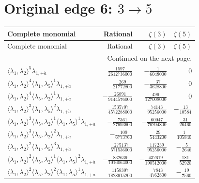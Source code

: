 \section{Original edge 6: $3\to 5$}
\begin{longtable}{@{}lrrr@{}}
\toprule
Complete monomial & Rational & $\zeta(3)$ & $\zeta(5)$ \\
\midrule\endfirsthead
\toprule Complete monomial & Rational & $\zeta(3)$ & $\zeta(5)$ \\
\midrule\endhead
\midrule\multicolumn{4}{r}{Continued on the next page.}\\\endfoot
\bottomrule\endlastfoot
$\langle\lambda_1,\lambda_2\rangle^{5}\lambda_{1,+\dot a}$ & $\frac{1597}{2612736000}$ & $-\frac{1}{6048000}$ & $0$ \\
$\langle\lambda_1,\lambda_2\rangle^{4}\langle\lambda_1,\lambda_5\rangle^{1}\lambda_{1,+\dot a}$ & $\frac{269}{21772800}$ & $-\frac{37}{3628800}$ & $0$ \\
$\langle\lambda_1,\lambda_2\rangle^{4}\langle\lambda_5,\lambda_2\rangle^{1}\lambda_{1,+\dot a}$ & $-\frac{26891}{9144576000}$ & $\frac{499}{127008000}$ & $0$ \\
$\langle\lambda_1,\lambda_2\rangle^{3}\langle\lambda_1,\lambda_5\rangle^{2}\lambda_{1,+\dot a}$ & $\frac{1535707}{4572288000}$ & $\frac{74143}{95256000}$ & $-\frac{13}{10584}$ \\
$\langle\lambda_1,\lambda_2\rangle^{3}\langle\lambda_5,\lambda_2\rangle^{1}\langle\lambda_1,\lambda_5\rangle^{1}\lambda_{1,+\dot a}$ & $-\frac{7361}{27993600}$ & $-\frac{60047}{76204800}$ & $\frac{31}{26460}$ \\
$\langle\lambda_1,\lambda_2\rangle^{3}\langle\lambda_5,\lambda_2\rangle^{2}\lambda_{1,+\dot a}$ & $-\frac{109}{6773760}$ & $\frac{29}{5443200}$ & $\frac{1}{105840}$ \\
$\langle\lambda_1,\lambda_2\rangle^{2}\langle\lambda_1,\lambda_5\rangle^{3}\lambda_{1,+\dot a}$ & $\frac{275137}{571536000}$ & $\frac{117239}{95256000}$ & $-\frac{5}{2646}$ \\
$\langle\lambda_1,\lambda_2\rangle^{2}\langle\lambda_5,\lambda_2\rangle^{1}\langle\lambda_1,\lambda_5\rangle^{2}\lambda_{1,+\dot a}$ & $-\frac{832639}{1016064000}$ & $-\frac{432619}{190512000}$ & $\frac{181}{52920}$ \\
$\langle\lambda_1,\lambda_2\rangle^{2}\langle\lambda_5,\lambda_2\rangle^{2}\langle\lambda_1,\lambda_5\rangle^{1}\lambda_{1,+\dot a}$ & $\frac{1158307}{1828915200}$ & $\frac{7843}{4762800}$ & $-\frac{19}{7560}$ \\

\end{longtable}
